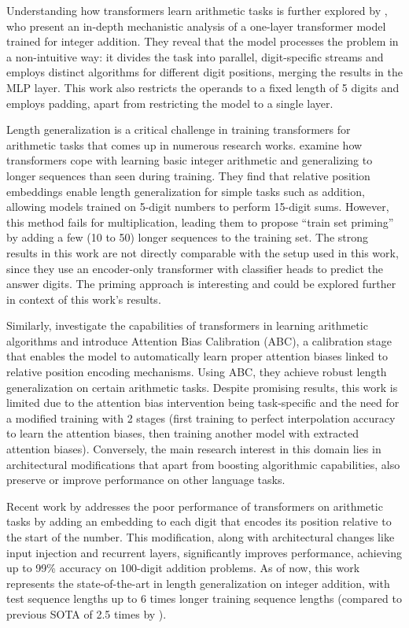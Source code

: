Understanding how transformers learn arithmetic tasks is further explored by \cite{quirke_understanding_2023}, who present an in-depth mechanistic analysis of a one-layer transformer model trained for integer addition. They reveal that the model processes the problem in a non-intuitive way: it divides the task into parallel, digit-specific streams and employs distinct algorithms for different digit positions, merging the results in the MLP layer. This work also restricts the operands to a fixed length of 5 digits and employs padding, apart from restricting the model to a single layer.

Length generalization is a critical challenge in training transformers for arithmetic tasks that comes up in numerous research works. \cite{jelassi_length_2023} examine how transformers cope with learning basic integer arithmetic and generalizing to longer sequences than seen during training. They find that relative position embeddings enable length generalization for simple tasks such as addition, allowing models trained on 5-digit numbers to perform 15-digit sums. However, this method fails for multiplication, leading them to propose ``train set priming'' by adding a few (10 to 50) longer sequences to the training set. The strong results in this work are not directly comparable with the setup used in this work, since they use an encoder-only transformer with classifier heads to predict the answer digits. The priming approach is interesting and could be explored further in context of this work's results.

Similarly, \cite{duan_interpolation_2023} investigate the capabilities of transformers in learning arithmetic algorithms and introduce Attention Bias Calibration (ABC), a calibration stage that enables the model to automatically learn proper attention biases linked to relative position encoding mechanisms. Using ABC, they achieve robust length generalization on certain arithmetic tasks. Despite promising results, this work is limited due to the attention bias intervention being task-specific and the need for a modified training with 2 stages (first training to perfect interpolation accuracy to learn the attention biases, then training another model with extracted attention biases). Conversely, the main research interest  in this domain lies in architectural modifications that apart from boosting algorithmic capabilities, also preserve or improve performance on other language tasks.

Recent work by \cite{mcleish_transformers_2024} addresses the poor performance of transformers on arithmetic tasks by adding an embedding to each digit that encodes its position relative to the start of the number. This modification, along with architectural changes like input injection and recurrent layers, significantly improves performance, achieving up to 99\% accuracy on 100-digit addition problems. As of now, this work represents the state-of-the-art in length generalization on integer addition, with test sequence lengths up to 6 times longer training sequence lengths (compared to previous SOTA of 2.5 times by \cite{zhou_transformers_2024}).

